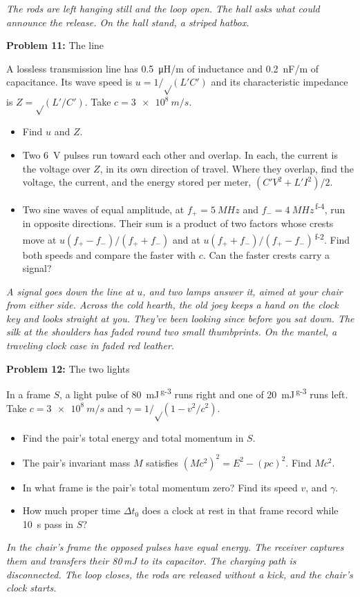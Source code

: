 \documentclass[11pt]{article}
\newcommand{\room}[1]{\par\bigskip{\large\bfseries #1}\par\nopagebreak\smallskip}
\newcommand{\scene}[1]{\par{\itshape #1}\par}
\newcommand{\problem}[2]{\par\medskip\textbf{Problem #1:} #2\par\nopagebreak}
\newenvironment{parts}{\begin{itemize}[leftmargin=3.4em,labelwidth=2.8em,labelsep=0.6em,align=left,itemsep=3pt,topsep=4pt]}{\end{itemize}}
\newcommand{\pt}[1]{\item[\textbf{#1}]}
\newcommand{\sv}[1]{\textsuperscript{\dag\,#1}}
\newcommand{\rt}{\text{√}}  %
\begin{document}
\room{Hall}
\scene{The rods are left hanging still and the loop open. The hall asks what could announce the release. On the hall stand, a striped hatbox.}
\problem{11}{The line}
A lossless transmission line has \SI{0.5}{\micro H/m} of inductance and \SI{0.2}{nF/m} of capacitance. Its wave speed is $u = 1/\rt(L'C')$ and its characteristic impedance is $Z = \rt(L'/C')$. Take $c = \SI{3e8}{m/s}$.
\begin{parts}
\pt{11-a} Find $u$ and $Z$.
\pt{11-b} Two \SI{6}{V} pulses run toward each other and overlap. In each, the current is the voltage over $Z$, in its own direction of travel. Where they overlap, find the voltage, the current, and the energy stored per meter, $(C'V^2 + L'I^2)/2$.
\pt{11-c} Two sine waves of equal amplitude, at $f_+ = \SI{5}{MHz}$ and $f_- = \SI{4}{MHz}$\sv{f-4}, run in opposite directions. Their sum is a product of two factors whose crests move at $u(f_+ - f_-)/(f_+ + f_-)$ and at $u(f_+ + f_-)/(f_+ - f_-)$\sv{f-2}. Find both speeds and compare the faster with $c$. Can the faster crests carry a signal?
\end{parts}

\clearpage
\room{Lounge}
\scene{A signal goes down the line at $u$, and two lamps answer it, aimed at your chair from either side. Across the cold hearth, the old joey keeps a hand on the clock key and looks straight at you. They've been looking since before you sat down. The silk at the shoulders has faded round two small thumbprints. On the mantel, a traveling clock case in faded red leather.}
\problem{12}{The two lights}
In a frame $S$, a light pulse of \SI{80}{mJ}\sv{g-3} runs right and one of \SI{20}{mJ}\sv{g-3} runs left. Take $c = \SI{3e8}{m/s}$ and $\gamma = 1/\rt(1 - v^2/c^2)$.
\begin{parts}
\pt{12-a} Find the pair's total energy and total momentum in $S$.
\pt{12-b} The pair's invariant mass $M$ satisfies $(Mc^2)^2 = E^2 - (pc)^2$. Find $Mc^2$.
\pt{12-c} In what frame is the pair's total momentum zero? Find its speed $v$, and $\gamma$.
\pt{12-d} How much proper time $\Delta t_0$ does a clock at rest in that frame record while \SI{10}{s} pass in $S$?
\end{parts}
\scene{In the chair's frame the opposed pulses have equal energy. The receiver captures them and transfers their 80\,mJ to its capacitor. The charging path is disconnected. The loop closes, the rods are released without a kick, and the chair's clock starts.}
\end{document}
